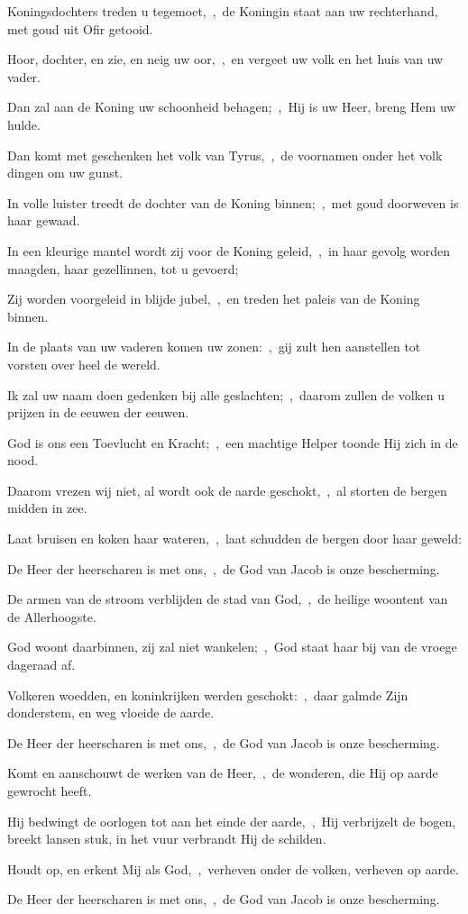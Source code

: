 \documentclass[12pt,twoside,a5paper]{article}
\begin{document}
\begin{halfparskip}
  Koningsdochters treden u tegemoet,~\sep\ de Koningin staat aan uw rechterhand, met goud uit Ofir getooid.

  Hoor, dochter, en zie, en neig uw oor,~\sep\ en vergeet uw volk en het huis van uw vader.

  Dan zal aan de Koning uw schoonheid behagen;~\sep\ Hij is uw Heer, breng Hem uw hulde.

  Dan komt met geschenken het volk van Tyrus,~\sep\ de voornamen onder het volk dingen om uw gunst.

  In volle luister treedt de dochter van de Koning binnen;~\sep\ met goud doorweven is haar gewaad.

  In een kleurige mantel wordt zij voor de Koning geleid,~\sep\ in haar gevolg worden maagden, haar
  gezellinnen, tot u gevoerd;

  Zij worden voorgeleid in blijde jubel,~\sep\ en treden het paleis van de Koning binnen.

  In de plaats van uw vaderen komen uw zonen:~\sep\ gij zult hen aanstellen tot vorsten over heel de wereld.

  Ik zal uw naam doen gedenken bij alle geslachten;~\sep\ daarom zullen de volken u prijzen in de eeuwen der eeuwen.

   God is ons een Toevlucht en Kracht;~\sep\ een machtige Helper toonde Hij zich in de nood.

  Daarom vrezen wij niet, al wordt ook de aarde geschokt,~\sep\ al storten de bergen midden in zee.

  Laat bruisen en koken haar wateren,~\sep\ laat schudden de bergen door haar geweld:

  De Heer der heerscharen is met ons,~\sep\ de God van Jacob is onze bescherming.

  De armen van de stroom verblijden de stad van God,~\sep\ de heilige woontent van de Allerhoogste.

  God woont daarbinnen, zij zal niet wankelen;~\sep\ God staat haar bij van de vroege dageraad af.

  Volkeren woedden, en koninkrijken werden geschokt:~\sep\ daar galmde Zijn donderstem, en weg vloeide de aarde.

  De Heer der heerscharen is met ons,~\sep\ de God van Jacob is onze bescherming.

  Komt en aanschouwt de werken van de Heer,~\sep\ de wonderen, die Hij op aarde gewrocht heeft.

  Hij bedwingt de oorlogen tot aan het einde der aarde,~\sep\ Hij verbrijzelt de bogen, breekt lansen stuk, in het vuur verbrandt Hij de schilden.

  Houdt op, en erkent Mij als God,~\sep\ verheven onder de volken, verheven op aarde.

  De Heer der heerscharen is met ons,~\sep\ de God van Jacob is onze bescherming.
\end{halfparskip}
\end{document}
